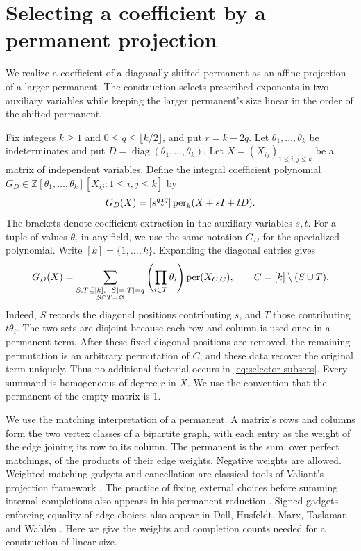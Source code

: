\section{Selecting a coefficient by a permanent projection}
\label{sec:selector}

We realize a coefficient of a diagonally shifted permanent as an affine
projection of a larger permanent.  The construction selects prescribed
exponents in two auxiliary variables while keeping the larger permanent's
size linear in the order of the shifted permanent.

Fix integers $k\ge1$ and $0\le q\le\lfloor k/2\rfloor$, and put
$r=k-2q$.  Let $\theta_1,\ldots,\theta_k$ be indeterminates and put
$D=\operatorname{diag}(\theta_1,\ldots,\theta_k)$.  Let
$X=(X_{ij})_{1\le i,j\le k}$ be a matrix of independent variables.
Define the integral coefficient polynomial
$G_D\in\mathbb Z[\theta_1,\ldots,\theta_k][X_{ij}:1\le i,j\le k]$ by
\begin{equation}
 G_D(X)=[s^qt^q]\operatorname{per}_k(X+sI+tD).
 \label{eq:selector-coefficient}
\end{equation}
The brackets denote coefficient extraction in the auxiliary variables
$s,t$.  For a tuple of values $\theta_i$ in any field, we use the same
notation $G_D$ for the specialized polynomial.  Write $[k]=\{1,\ldots,k\}$.
Expanding the diagonal entries gives
\begin{equation}
 G_D(X)=
 \sum_{\substack{S,T\subseteq[k],\ |S|=|T|=q\\S\cap T=\varnothing}}
 \left(\prod_{i\in T}\theta_i\right)\operatorname{per}(X_{C,C}),
 \qquad C=[k]\setminus(S\cup T).
 \label{eq:selector-subsets}
\end{equation}
Indeed, $S$ records the diagonal positions contributing $s$, and $T$
those contributing $t\theta_i$.  The two sets are disjoint because each
row and column is used once in a permanent term.  After these fixed
diagonal positions are removed, the remaining permutation is an arbitrary
permutation of $C$, and these data recover the original term uniquely.
Thus no additional factorial occurs in
\eqref{eq:selector-subsets}.  Every summand is homogeneous of degree $r$
in $X$.
We use the convention that the permanent of the empty matrix is $1$.

We use the matching interpretation of a permanent.  A matrix's rows and
columns form the two vertex classes of a bipartite graph, with each entry
as the weight of the edge joining its row to its column.  The permanent is the
sum, over perfect matchings, of the products of their edge weights.
Negative weights are allowed.  Weighted matching gadgets and cancellation are
classical tools of Valiant's projection framework \cite{Valiant1979Algebra}.
The practice of fixing external choices before summing internal
completions also appears in his permanent reduction
\cite[Lemma~3.1 and its proof]{Valiant1979Permanent}.
Signed gadgets enforcing equality of edge choices also appear in
Dell, Husfeldt, Marx, Taslaman and Wahl\'en
\cite[Section~3 and Figure~2]{DellHusfeldtMarxTaslamanWahlen2014}.
Here we give the weights and completion counts needed for a construction
of linear size.

